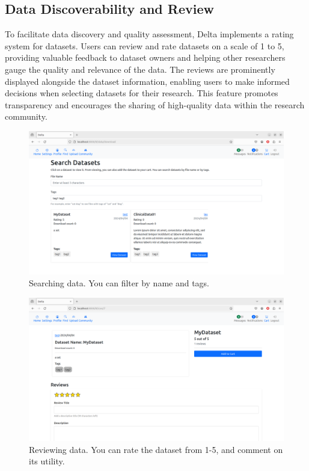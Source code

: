 \documentclass[conference]{IEEEtran}
\begin{document}
\subsection{Data Discoverability and Review}
To facilitate data discovery and quality assessment, Delta implements a rating system for datasets. Users can review and rate datasets on a scale of 1 to 5, providing valuable feedback to dataset owners and helping other researchers gauge the quality and relevance of the data. The reviews are prominently displayed alongside the dataset information, enabling users to make informed decisions when selecting datasets for their research. This feature promotes transparency and encourages the sharing of high-quality data within the research community.
\begin{figure}[h]
  \centering
  \includegraphics[width=\columnwidth]{figures/search.png}
  \caption{Searching data. You can filter by name and tags.}
  \label{fig:delta-search}
\end{figure}
\begin{figure}[h]
  \centering
  \includegraphics[width=\columnwidth]{figures/review.png}
  \caption{Reviewing data. You can rate the dataset from 1-5, and comment on its utility.}
  \label{fig:delta-review}
\end{figure}
\end{document}

